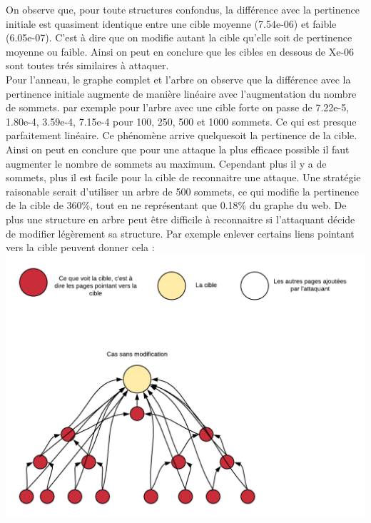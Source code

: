 \documentclass[a4paper,11pt]{article}
\begin{document}
		On observe que, pour toute structures confondus, la différence avec la pertinence initiale est quasiment identique entre une cible moyenne (7.54e-06) et faible (6.05e-07).
		C'est à dire que on modifie autant la cible qu'elle soit de pertinence moyenne ou faible. Ainsi on peut en conclure que les cibles en dessous de Xe-06 sont toutes trés similaires à attaquer.\\
		
		Pour l'anneau, le graphe complet et l'arbre on observe que la différence avec la pertinence initiale augmente de manière linéaire avec l'augmentation du nombre de sommets.
		par exemple pour l'arbre avec une cible forte on passe de 7.22e-5, 1.80e-4, 3.59e-4, 7.15e-4 pour 100, 250, 500 et 1000 sommets. Ce qui est presque parfaitement linéaire.
		Ce phénomène arrive quelquesoit la pertinence de la cible. Ainsi on peut en conclure que pour une attaque la plus efficace possible il faut augmenter le nombre de sommets au maximum.
		Cependant plus il y a de sommets, plus il est facile pour la cible de reconnaitre une attaque. Une stratégie raisonable serait d'utiliser un arbre de 500 sommets, 
		ce qui modifie la pertinence de la cible de 360\%, tout en ne représentant que 0.18\% du graphe du web. De plus une structure en arbre peut être difficile à reconnaitre si l'attaquant décide 
		de modifier légèrement sa structure. Par exemple enlever certains liens pointant vers la cible peuvent donner cela : \\
		\includegraphics[scale = 0.5]{Captures/diagramme1.png}\\
\end{document}
